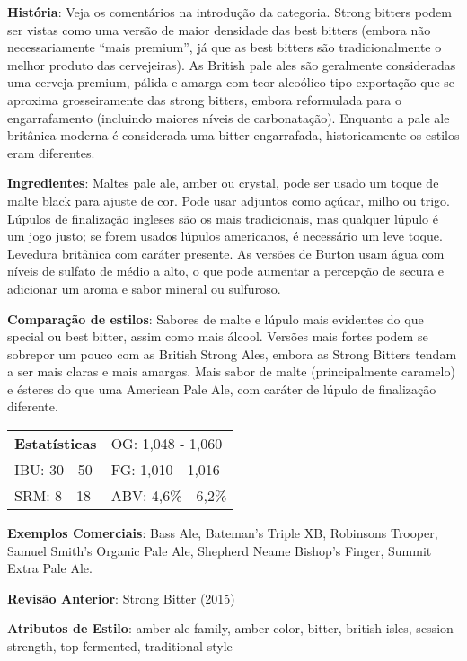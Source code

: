 \textbf{História}: Veja os comentários na introdução da categoria. Strong bitters podem ser vistas como uma versão de maior densidade das best bitters (embora não necessariamente “mais premium”, já que as best bitters são tradicionalmente o melhor produto das cervejeiras). As British pale ales são geralmente consideradas uma cerveja premium, pálida e amarga com teor alcoólico tipo exportação que se aproxima grosseiramente das strong bitters, embora reformulada para o engarrafamento (incluindo maiores níveis de carbonatação). Enquanto a pale ale britânica moderna é considerada uma bitter engarrafada, historicamente os estilos eram diferentes.

\textbf{Ingredientes}: Maltes pale ale, amber ou crystal, pode ser usado um toque de malte black para ajuste de cor. Pode usar adjuntos como açúcar, milho ou trigo. Lúpulos de finalização ingleses são os mais tradicionais, mas qualquer lúpulo é um jogo justo; se forem usados lúpulos americanos, é necessário um leve toque. Levedura britânica com caráter presente. As versões de Burton usam água com níveis de sulfato de médio a alto, o que pode aumentar a percepção de secura e adicionar um aroma e sabor mineral ou sulfuroso.

\textbf{Comparação de estilos}: Sabores de malte e lúpulo mais evidentes do que special ou best bitter, assim como mais álcool. Versões mais fortes podem se sobrepor um pouco com as British Strong Ales, embora as Strong Bitters tendam a ser mais claras e mais amargas. Mais sabor de malte (principalmente caramelo) e ésteres do que uma American Pale Ale, com caráter de lúpulo de finalização diferente.

\begin{tabular}{@{}p{35mm}p{35mm}@{}}
  \textbf{Estatísticas} & OG: 1,048 - 1,060 \\
  IBU: 30 - 50  & FG: 1,010 - 1,016  \\
  SRM: 8 - 18  & ABV: 4,6\% - 6,2\%
\end{tabular}

\textbf{Exemplos Comerciais}: Bass Ale, Bateman’s Triple XB, Robinsons Trooper, Samuel Smith’s Organic Pale Ale, Shepherd Neame Bishop's Finger, Summit Extra Pale Ale.

\textbf{Revisão Anterior}: Strong Bitter (2015)

\textbf{Atributos de Estilo}: amber-ale-family, amber-color, bitter, british-isles, session-strength, top-fermented, traditional-style